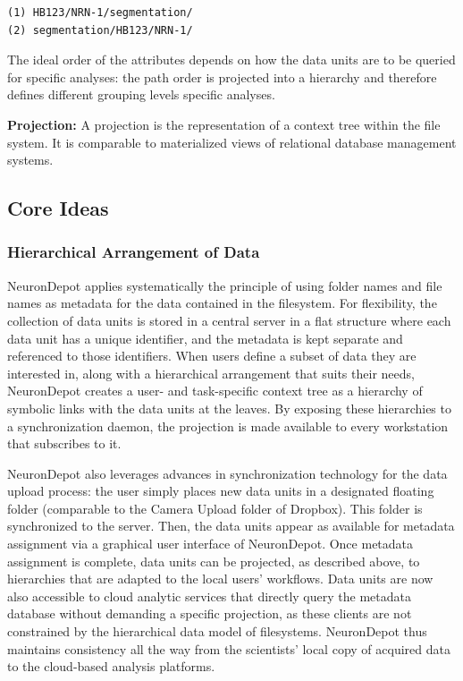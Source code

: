 \documentclass{frontiersSCNS} %
\begin{document}
\begin{lstlisting}[style=display]
(1) HB123/NRN-1/segmentation/
(2) segmentation/HB123/NRN-1/
\end{lstlisting}


The ideal order of the attributes depends on how the data units are to be
queried for specific analyses: the path order is projected into a hierarchy and
therefore defines different grouping levels specific analyses.


\textbf{Projection:} A projection is the representation of a context tree
within the file system. It is comparable to materialized views of relational
database management systems.

\subsection{Core Ideas}
\subsubsection{Hierarchical Arrangement of Data}

NeuronDepot applies systematically the principle of using folder names and file
names as metadata for the data contained in the filesystem. For flexibility,
the collection of data units is stored in a central server in a flat structure
where each data unit has a unique identifier, and the metadata is kept separate
and referenced to those identifiers. When users define a subset of data they
are interested in, along with a hierarchical arrangement that suits their
needs, NeuronDepot creates a user- and task-specific context tree as a
hierarchy of symbolic links with the data units at the leaves. By exposing
these hierarchies to a synchronization daemon, the projection is made available
to every workstation that subscribes to it.

NeuronDepot also leverages advances in synchronization technology for the data
upload process: the user simply places new data units in a designated floating
folder (comparable to the Camera Upload folder of Dropbox). This folder is
synchronized to the server. Then, the data units appear as available for
metadata assignment via a graphical user interface of NeuronDepot. Once
metadata assignment is complete, data units can be projected, as described
above, to hierarchies that are adapted to the local users' workflows. Data
units are now also accessible to cloud analytic services that directly query
the metadata database without demanding a specific projection, as these clients
are not constrained by the hierarchical data model of filesystems. NeuronDepot
thus maintains consistency all the way from the scientists' local copy of
acquired data to the cloud-based analysis platforms.
\end{document}
